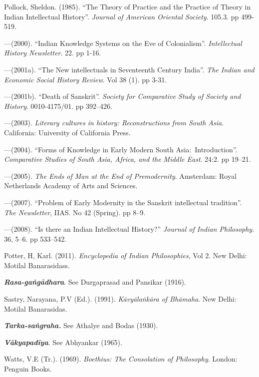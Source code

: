 \begin{thebibliography}{99}
 Pollock, Sheldon. (1985). “The Theory of Practice and the Practice of Theory in Indian Intellectual History”. {\sl Journal of American Oriental Society}. 105.3. pp 499-519. 

 ---\kern3pt(2000). “Indian Knowledge Systems on the Eve of Colonialism”. {\sl Intellectual History Newsletter}. 22. pp 1-16.

 ---\kern3pt(2001a). “The New intellectuals in Seventeenth Century India”. {\sl The Indian and Economic Social History Review}. Vol 38 (1). pp 3-31.

 ---\kern3pt(2001b). “Death of Sanskrit”. {\sl Society for Comparative Study of Society and History}. 0010-4175/01. pp 392–426. 

 ---\kern3pt(2003). {\sl Literary cultures in history: Reconstructions from South Asia}. California: University of California Press. 

 ---\kern3pt(2004). “Forms of Knowledge in Early Modern South Asia:~Introduction”. {\sl Comparative Studies of South Asia, Africa, and the Middle East}. 24:2. pp 19--21.

 ---\kern3pt(2005). {\sl The Ends of Man at the End of Premodernity}. Amsterdam: Royal Netherlands Academy of Arts and Sciences. 

 ---\kern3pt(2007). “Problem of Early Modernity in the Sanskrit intellectual tradition”. {\sl The Newsletter}, IIAS. No 42 (Spring). pp 8--9. 

 ---\kern3pt(2008). “Is there an Indian Intellectual History?” {\sl Journal of Indian Philosophy}. 36, 5--6. pp 533--542.

 Potter, H, Karl. (2011). {\sl  Encyclopedia of Indian Philosophies}, Vol 2. New Delhi: Motilal Banarasidass. 

{\sl\bfseries Rasa-gaṅgādhara}. See Durgaprasad and Pansikar (1916).

 Sastry, Narayana, P.V (Ed.). (1991). {\sl Kāvyālaṅkāra of Bhāmaha}. New Delhi: Motilal Banarasidas. 

 {\sl\bfseries Tarka-saṅgraha.} See Athalye and Bodas (1930).

{\sl\bfseries Vākyapadīya}. See Abhyankar (1965).

 Watts, V.E (Tr.). (1969). {\sl Boethius: The Consolation of Philosophy}. London: Penguin Books. 
\end{thebibliography}

\theendnotes
\label{chapter\thechapter:end}
